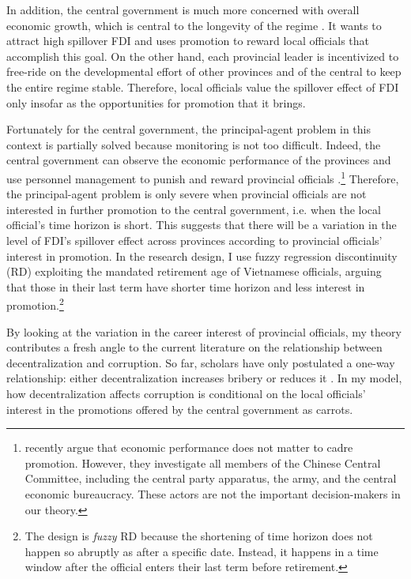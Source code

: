 In addition, the central government is much more concerned with overall economic growth, which is central to the longevity of the regime \citep{Malesky2008}. It wants to attract high spillover FDI and uses promotion to reward local officials that accomplish this goal. On the other hand, each provincial leader is incentivized to free-ride on the developmental effort of other provinces and of the central to keep the entire regime stable. Therefore, local officials value the spillover effect of FDI only insofar as the opportunities for promotion that it brings.

Fortunately for the central government, the principal-agent problem in this context is partially solved because monitoring is not too difficult. Indeed, the central government can observe the economic performance of the provinces and use personnel management to punish and reward provincial officials \citep{Sheng2007, Li2005}.\footnote{\citet{Shih2012} recently argue that economic performance does not matter to cadre promotion. However, they investigate all members of the Chinese Central Committee, including the central party apparatus, the army, and the central economic bureaucracy. These actors are not the important decision-makers in our theory.} Therefore, the principal-agent problem is only severe when provincial officials are not interested in further promotion to the central government, i.e. when the local official's time horizon is short. This suggests that there will be a variation in the level of FDI's spillover effect across provinces according to provincial officials' interest in promotion. In the research design, I use fuzzy regression discontinuity (RD) exploiting the mandated retirement age of Vietnamese officials, arguing that those in their last term have shorter time horizon and less interest in promotion.\footnote{The design is \textit{fuzzy} RD because the shortening of time horizon does not happen so abruptly as after a specific date. Instead, it happens in a time window after the official enters their last term before retirement.}

By looking at the variation in the career interest of provincial officials, my theory contributes a fresh angle to the current literature on the relationship between decentralization and corruption. So far, scholars have only postulated a one-way relationship: either decentralization increases bribery \citep{Fan2009} or reduces it \citep{Guerra2009}. In my model, how decentralization affects corruption is conditional on the local officials' interest in the promotions offered by the central government as carrots.


